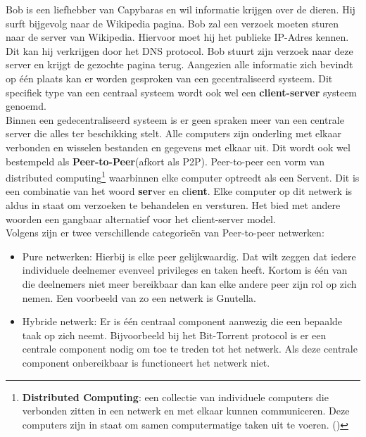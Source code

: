 Bob is een liefhebber van Capybaras en wil informatie krijgen over de dieren. Hij surft bijgevolg naar de Wikipedia pagina. Bob zal een verzoek moeten sturen naar de server van Wikipedia. Hiervoor moet hij het publieke IP-Adres kennen. Dit kan hij verkrijgen door het DNS protocol. Bob stuurt zijn verzoek naar deze server en krijgt de gezochte pagina terug. Aangezien alle informatie zich bevindt op één plaats kan er worden gesproken van een gecentraliseerd systeem. Dit specifiek type van een centraal systeem wordt ook wel een \textbf{client-server} systeem genoemd.\\

Binnen een gedecentraliseerd systeem is er geen spraken meer van een centrale server die alles ter beschikking stelt. Alle computers zijn onderling met elkaar verbonden en wisselen bestanden en gegevens met elkaar uit. Dit wordt ook wel bestempeld als \textbf{Peer-to-Peer}(afkort als P2P). Peer-to-peer een vorm van distributed computing\footnote{\textbf{Distributed Computing}: een collectie van individuele computers die verbonden zitten in een netwerk en met elkaar kunnen communiceren. Deze computers zijn in staat om samen computermatige taken uit te voeren. (\autocite{Attiya2004})} waarbinnen elke computer optreedt als een Servent. Dit is een combinatie van het woord \textbf{ser}ver en cli\textbf{ent}. Elke computer op dit netwerk is aldus in staat om verzoeken te behandelen en versturen. Het bied met andere woorden een gangbaar alternatief voor het client-server model. \\
 
Volgens \textcite{Schollmeier2001} zijn er  twee verschillende categorieën van Peer-to-peer netwerken:

\begin{itemize}
\item Pure netwerken: Hierbij is elke peer gelijkwaardig. Dat wilt zeggen dat iedere individuele deelnemer evenveel privileges en taken heeft. Kortom is één van die deelnemers niet meer bereikbaar dan kan elke andere peer zijn rol op zich nemen. Een voorbeeld van zo een netwerk is Gnutella.\\

\item Hybride netwerk: Er is één centraal component aanwezig die een bepaalde taak op zich neemt. Bijvoorbeeld bij het Bit-Torrent protocol is er een centrale component nodig om toe te treden tot het netwerk. Als deze centrale component onbereikbaar is functioneert het netwerk niet.\\
\end{itemize}


